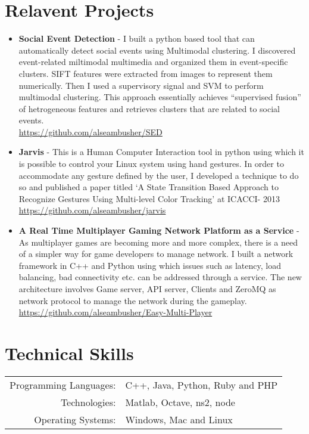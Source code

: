 \documentclass[a4paper,10pt]{article} %
\begin{document}
\section{Relavent Projects}
\begin{itemize}
 \item \textbf{Social Event Detection} - I built a python based tool that can automatically detect social events using Multimodal clustering. I discovered event-related miltimodal multimedia and organized them in event-specific clusters. SIFT features were extracted from images to represent them numerically. Then I used a supervisory signal and SVM to perform multimodal clustering. This approach essentially achieves “supervised fusion” of hetrogeneous features and retrieves clusters that are related to social events.\\
 \href{https://github.com/alseambusher/SED}{https://github.com/alseambusher/SED}
 \item \textbf{Jarvis} - This is a Human Computer Interaction tool in python using which it is possible to control your Linux system using hand gestures. In order to accommodate any gesture defined by the user, I developed a technique to do so and published a paper titled ‘A State Transition Based Approach to Recognize Gestures Using Multi-level Color Tracking’ at ICACCI- 2013 \\
 \href{https://github.com/alseambusher/jarvis}{https://github.com/alseambusher/jarvis}
 \item \textbf{A Real Time Multiplayer Gaming Network Platform as a Service} - As multiplayer games are becoming more and more complex, there is a need of a simpler way for game developers to manage network. I built a network framework in C++ and Python using which issues such as latency, load balancing, bad connectivity etc. can be addressed through a service. The new architecture involves Game server, API server, Clients and ZeroMQ as network protocol to manage the network during the gameplay.\\
 \href{https://github.com/alseambusher/Easy-Multi-Player}{https://github.com/alseambusher/Easy-Multi-Player}
\end{itemize}


\section{Technical Skills}
\renewcommand{\arraystretch}{1}%
\begin{tabular}{rl}

Programming Languages: &  C++, Java, Python, Ruby and PHP\\
Technologies: & Matlab, Octave, ns2, node \\
Operating Systems: & Windows, Mac and Linux

\end{tabular}
\end{document}
